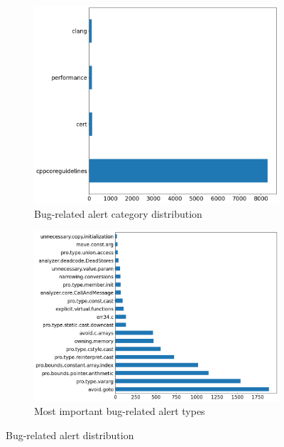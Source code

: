 \begin{figure}[H]
	\begin{subfigure}{0.5\textwidth}
		\centering
		\includegraphics[scale=0.24]{./src/brls/brls_category.png}
		\caption{Bug-related alert category distribution}\label{}
	\end{subfigure}%
	\begin{subfigure}{0.5\textwidth}
		\centering
		\includegraphics[scale=0.25]{./src/brls/brls_type.png}
		\caption{Most important bug-related alert types}\label{}
	\end{subfigure}
	\caption{Bug-related alert distribution}
	\label{results:bralerts}
\end{figure}

